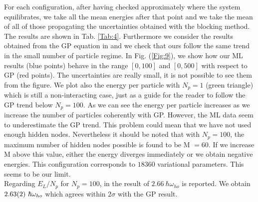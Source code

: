 For each configuration, after having checked approximately where the system equilibrates, we take all the mean energies after that point and we take the mean of all of those propagating the uncertainties obtained with the blocking method. The results are shown in Tab. \ref{Tab:4}. 
Furthermore we consider the results obtained from the GP equation in \cite{DalfString} and we check that ours follow the same trend in the small number of particle regime. In Fig. (\ref{Fig:9}), we show how our ML results (blue points) behave in the range $[0,100]$ and $[0,500]$ with respect to GP (red points). The uncertainties are really small, it is not possible to see them from the figure. We plot also the energy per particle with $N_p=1$ (green triangle) which is still a non-interacting case, just as a guide for the reader to follow the GP trend below $N_p=100$. As we can see the energy per particle increases as we increase the number of particles coherently with GP. However, the ML data seem to underestimate the GP trend. This problem could mean that we have not used enough hidden nodes. Nevertheless it should be noted that with $N_p=100$, the maximum number of hidden nodes possible is found to be M $=60$. If we increase M above this value, either the energy diverges immediately or we obtain negative energies. This configuration corresponds to $18360$ variational parameters. This seems to be our limit.\\
Regarding $E_L/N_p$ for $N_p=100$, in \cite{DalfString} the result of $2.66\ \hbar\omega_{ho}$ is reported. We obtain $\SI{2.63\pm 0.02}{}\ \hbar\omega_{ho}$ which agrees within $2\sigma$ with the GP result. 


